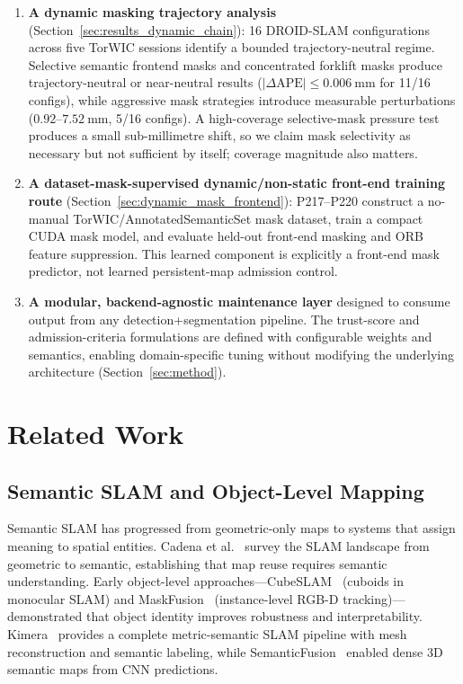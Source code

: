 \documentclass[journal]{IEEEtran}
\begin{document}
\begin{enumerate}
  \item \textbf{A dynamic masking trajectory analysis} (Section~\ref{sec:results_dynamic_chain}): 16 DROID-SLAM configurations across five TorWIC sessions identify a bounded trajectory-neutral regime. Selective semantic frontend masks and concentrated forklift masks produce trajectory-neutral or near-neutral results ($|\Delta\text{APE}| \leq 0.006~\text{mm}$ for 11/16 configs), while aggressive mask strategies introduce measurable perturbations ($0.92$--$7.52~\text{mm}$, 5/16 configs). A high-coverage selective-mask pressure test produces a small sub-millimetre shift, so we claim mask selectivity as necessary but not sufficient by itself; coverage magnitude also matters.

  \item \textbf{A dataset-mask-supervised dynamic/non-static front-end training route} (Section~\ref{sec:dynamic_mask_frontend}): P217--P220 construct a no-manual TorWIC/AnnotatedSemanticSet mask dataset, train a compact CUDA mask model, and evaluate held-out front-end masking and ORB feature suppression. This learned component is explicitly a front-end mask predictor, not learned persistent-map admission control.
  
  \item \textbf{A modular, backend-agnostic maintenance layer} designed to consume output from any detection+segmentation pipeline. The trust-score and admission-criteria formulations are defined with configurable weights and semantics, enabling domain-specific tuning without modifying the underlying architecture (Section~\ref{sec:method}).
\end{enumerate}

\section{Related Work}
\label{sec:related_work}

\subsection{Semantic SLAM and Object-Level Mapping}
\label{sec:related_semantic}

Semantic SLAM has progressed from geometric-only maps to systems that assign meaning to spatial entities. Cadena et al.~\cite{cadena2016past} survey the SLAM landscape from geometric to semantic, establishing that map reuse requires semantic understanding. Early object-level approaches---CubeSLAM~\cite{yang2019cubeslam} (cuboids in monocular SLAM) and MaskFusion~\cite{runz2018maskfusion} (instance-level RGB-D tracking)---demonstrated that object identity improves robustness and interpretability. Kimera~\cite{rosinol2020kimera} provides a complete metric-semantic SLAM pipeline with mesh reconstruction and semantic labeling, while SemanticFusion~\cite{mccormac2017semanticfusion} enabled dense 3D semantic maps from CNN predictions.
\end{document}
